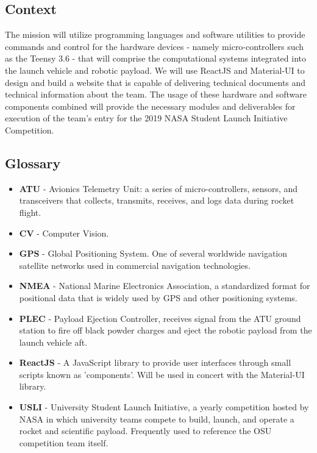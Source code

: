 \documentclass[journal,10pt,draftclsnofoot,onecolumn,compsoc]{IEEEtran} \usepackage[margin=0.75in]{geometry}
\begin{document}
\subsection{Context}
The mission will utilize programming languages and software utilities to provide commands and control for the hardware devices - namely micro-controllers such as the Teensy 3.6 - that will comprise the computational systems integrated into the launch vehicle and robotic payload. We will use ReactJS and Material-UI to design and build a website that is capable of delivering technical documents and technical information about the team. The usage of these hardware and software components combined will provide the necessary modules and deliverables for execution of the team's entry for the 2019 NASA Student Launch Initiative Competition.  
\subsection{Glossary}
\begin{itemize}
    \item \textbf{ATU} - Avionics Telemetry Unit: a series of micro-controllers, sensors, and transceivers that collects, transmits, receives, and logs data during rocket flight.
    \item \textbf{CV} - Computer Vision.
    \item \textbf{GPS} - Global Positioning System. One of several worldwide navigation satellite networks used in commercial navigation technologies.
    \item \textbf{NMEA} - National Marine Electronics Association, a standardized format for positional data that is widely used by GPS and other positioning systems.
    \item \textbf{PLEC} - Payload Ejection Controller, receives signal from the ATU ground station to fire off black powder charges and eject the robotic payload from the launch vehicle aft.
    \item \textbf{ReactJS} - A JavaScript library to provide user interfaces through small scripts known as 'components'. Will be used in concert with the Material-UI library. 
    \item \textbf{USLI} - University Student Launch Initiative, a yearly competition hosted by NASA in which university teams compete to build, launch, and operate a rocket and scientific payload. Frequently used to reference the OSU competition team itself.
\end{itemize}
\end{document}
